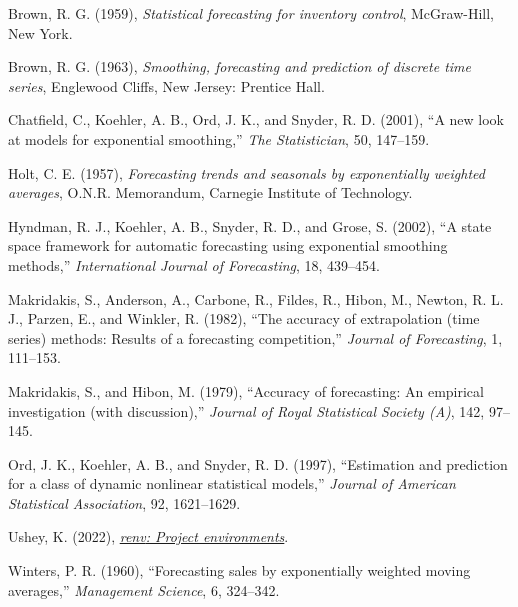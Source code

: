 \documentclass[
  11pt,
  a4paper,
  nottoc]{report}
\newlength{\cslhangindent}
\newenvironment{CSLReferences}[2] %
 {\begin{list}{}{%
  \setlength{\itemindent}{0pt}
  \setlength{\leftmargin}{0pt}
  \setlength{\parsep}{0pt}
  \ifodd #1
   \setlength{\leftmargin}{\cslhangindent}
   \setlength{\itemindent}{-1\cslhangindent}
  \fi
  \setlength{\itemsep}{#2\baselineskip}}}
 {\end{list}}
\begin{document}
\label{refs}
\begin{CSLReferences}{1}{0}
Brown, R. G. (1959), \emph{Statistical forecasting for inventory
control}, McGraw-Hill, New York.

Brown, R. G. (1963), \emph{Smoothing, forecasting and prediction of
discrete time series}, Englewood Cliffs, New Jersey: Prentice Hall.

Chatfield, C., Koehler, A. B., Ord, J. K., and Snyder, R. D. (2001),
{``A new look at models for exponential smoothing,''} \emph{The
Statistician}, 50, 147--159.

Holt, C. E. (1957), \emph{Forecasting trends and seasonals by
exponentially weighted averages}, O.N.R. Memorandum, Carnegie Institute
of Technology.

Hyndman, R. J., Koehler, A. B., Snyder, R. D., and Grose, S. (2002),
{``A state space framework for automatic forecasting using exponential
smoothing methods,''} \emph{International Journal of Forecasting}, 18,
439--454.

Makridakis, S., Anderson, A., Carbone, R., Fildes, R., Hibon, M.,
Newton, R. L. J., Parzen, E., and Winkler, R. (1982), {``The accuracy of
extrapolation (time series) methods: Results of a forecasting
competition,''} \emph{Journal of Forecasting}, 1, 111--153.

Makridakis, S., and Hibon, M. (1979), {``Accuracy of forecasting: An
empirical investigation (with discussion),''} \emph{Journal of Royal
Statistical Society (A)}, 142, 97--145.

Ord, J. K., Koehler, A. B., and Snyder, R. D. (1997), {``Estimation and
prediction for a class of dynamic nonlinear statistical models,''}
\emph{Journal of American Statistical Association}, 92, 1621--1629.

Ushey, K. (2022),
\emph{\href{https://CRAN.R-project.org/package=renv}{{renv}: Project
environments}}.

Winters, P. R. (1960), {``Forecasting sales by exponentially weighted
moving averages,''} \emph{Management Science}, 6, 324--342.

\end{CSLReferences}
\end{document}
